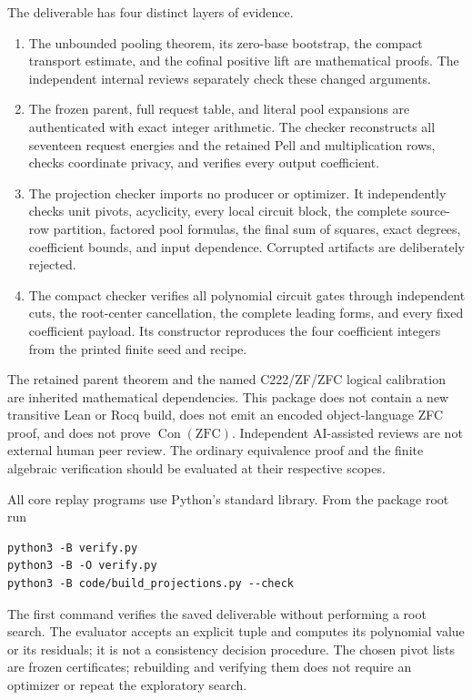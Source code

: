 \documentclass[11pt]{article}
\theoremstyle{definition}\newtheorem{definition}[theorem]{Definition}
\theoremstyle{remark}\newtheorem{remark}[theorem]{Remark}
\newcommand{\Con}{\operatorname{Con}}
\begin{document}
The deliverable has four distinct layers of evidence.
\begin{enumerate}
\item The unbounded pooling theorem, its zero-base bootstrap, the compact
transport estimate, and the cofinal positive lift are mathematical proofs.
The independent internal reviews separately check these changed arguments.
\item The frozen parent, full request table, and literal pool expansions
are authenticated with exact integer arithmetic. The checker reconstructs
all seventeen request energies and the retained Pell and multiplication
rows, checks coordinate privacy, and verifies every output coefficient.
\item The projection checker imports no producer or optimizer. It
independently checks unit pivots, acyclicity, every local circuit block,
the complete source-row partition, factored pool formulas, the final sum
of squares, exact degrees, coefficient bounds, and input dependence.
Corrupted artifacts are deliberately rejected.
\item The compact checker verifies all polynomial circuit gates through
independent cuts, the root-center cancellation, the complete leading
forms, and every fixed coefficient payload. Its constructor reproduces
the four coefficient integers from the printed finite seed and recipe.
\end{enumerate}

The retained parent theorem and the named C222/ZF/ZFC logical calibration
are inherited mathematical dependencies. This package does not contain a
new transitive Lean or Rocq build, does not emit an encoded object-language
ZFC proof, and does not prove $\Con(\mathrm{ZFC})$. Independent AI-assisted
reviews are not external human peer review. The ordinary equivalence
proof and the finite algebraic verification should be evaluated at their
respective scopes.

All core replay programs use Python's standard library. From the package
root run
\begin{verbatim}
python3 -B verify.py
python3 -B -O verify.py
python3 -B code/build_projections.py --check
\end{verbatim}
The first command verifies the saved deliverable without performing a
root search. The evaluator accepts an explicit tuple and computes its
polynomial value or its residuals; it is not a consistency decision
procedure. The chosen pivot lists are frozen certificates; rebuilding and
verifying them does not require an optimizer or repeat the exploratory search.
\end{document}
